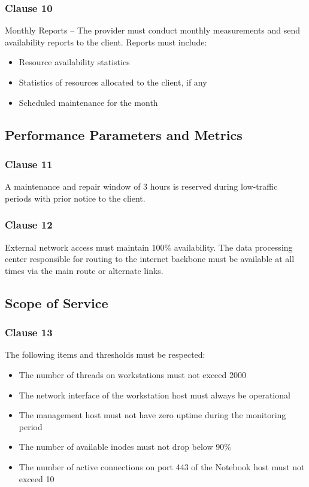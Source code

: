 \subsubsection*{Clause 10}
Monthly Reports – The provider must conduct monthly measurements and send availability reports to the client. Reports must include:
\begin{itemize}
  \item Resource availability statistics
  \item Statistics of resources allocated to the client, if any
  \item Scheduled maintenance for the month
\end{itemize}

\subsection{Performance Parameters and Metrics}
\subsubsection*{Clause 11}
A maintenance and repair window of 3 hours is reserved during low-traffic periods with prior notice to the client.

\subsubsection*{Clause 12}
External network access must maintain 100\% availability. The data processing center responsible for routing to the internet backbone must be available at all times via the main route or alternate links.

\subsection{Scope of Service}
\subsubsection*{Clause 13}
The following items and thresholds must be respected:
\begin{itemize}
  \item The number of threads on workstations must not exceed 2000
  \item The network interface of the workstation host must always be operational
  \item The management host must not have zero uptime during the monitoring period
  \item The number of available inodes must not drop below 90\%
  \item The number of active connections on port 443 of the Notebook host must not exceed 10
\end{itemize}

